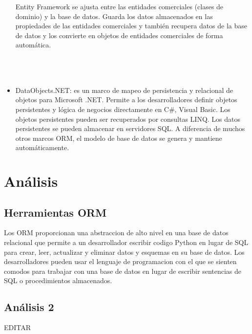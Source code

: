 \documentclass[preprint,12pt]{elsarticle}
\begin{document}
\begin{itemize}
 Entity Framework se ajusta entre las entidades comerciales (clases de dominio) y la base de datos. Guarda los datos almacenados en las propiedades de las entidades comerciales y también recupera datos de la base de datos y los convierte en objetos de entidades comerciales de forma automática.\\
\\
\\
\\
	\item DataObjects.NET: es un marco de mapeo de persistencia y relacional de objetos para Microsoft .NET. Permite a los desarrolladores definir objetos persistentes y lógica de negocios directamente en C\#, Visual Basic. Los objetos persistentes pueden ser recuperados por consultas LINQ. Los datos persistentes se pueden almacenar en servidores SQL. A diferencia de muchos otros marcos ORM, el modelo de base de datos se genera y mantiene automáticamente.\cite{do} \\
\end{itemize}



 



\section{Análisis}

\subsection{\textbf{Herramientas ORM}}
Los ORM proporcionan una abstraccion de alto nivel
en una base de datos relacional que permite a un desarrollador escribir codigo Python en lugar de SQL para crear, leer, actualizar y eliminar datos y esquemas en su base de datos. Los desarrolladores pueden usar el lenguaje de programacion con el que se sienten comodos para trabajar con una base de datos en lugar de escribir sentencias de SQL o procedimientos almacenados.\\

\subsection{\textbf{Análisis 2}}
EDITAR\\
\end{document}
